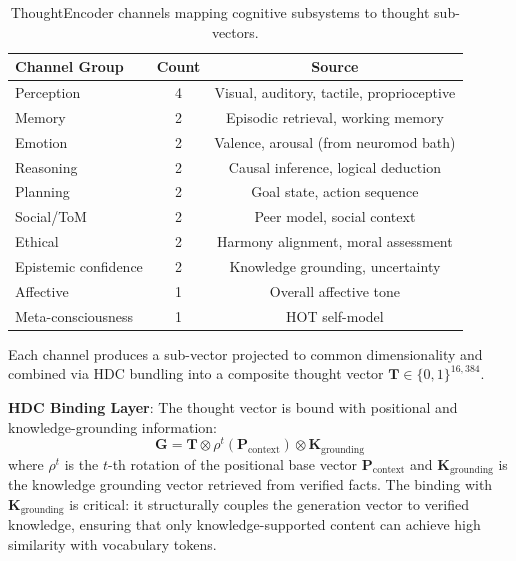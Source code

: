 \documentclass[12pt]{book}
\newcommand{\bind}{\otimes}
\begin{document}
\begin{table}[H]
\centering
\caption{ThoughtEncoder channels mapping cognitive subsystems to thought sub-vectors.}
\label{tab:thought-channels}
\begin{tabular}{lcc}
\toprule
\textbf{Channel Group} & \textbf{Count} & \textbf{Source} \\
\midrule
Perception & 4 & Visual, auditory, tactile, proprioceptive \\
Memory & 2 & Episodic retrieval, working memory \\
Emotion & 2 & Valence, arousal (from neuromod bath) \\
Reasoning & 2 & Causal inference, logical deduction \\
Planning & 2 & Goal state, action sequence \\
Social/ToM & 2 & Peer model, social context \\
Ethical & 2 & Harmony alignment, moral assessment \\
Epistemic confidence & 2 & Knowledge grounding, uncertainty \\
Affective & 1 & Overall affective tone \\
Meta-consciousness & 1 & HOT self-model \\
\bottomrule
\end{tabular}
\end{table}

Each channel produces a sub-vector projected to common dimensionality and combined via HDC bundling into a composite thought vector $\mathbf{T} \in \{0,1\}^{16{,}384}$.

\textbf{HDC Binding Layer}: The thought vector is bound with positional and knowledge-grounding information:
\begin{equation}\label{eq:broca-binding}
\mathbf{G} = \mathbf{T} \bind \rho^t(\mathbf{P}_{\text{context}}) \bind \mathbf{K}_{\text{grounding}}
\end{equation}
where $\rho^t$ is the $t$-th rotation of the positional base vector $\mathbf{P}_{\text{context}}$ and $\mathbf{K}_{\text{grounding}}$ is the knowledge grounding vector retrieved from verified facts. The binding with $\mathbf{K}_{\text{grounding}}$ is critical: it structurally couples the generation vector to verified knowledge, ensuring that only knowledge-supported content can achieve high similarity with vocabulary tokens.
\end{document}
